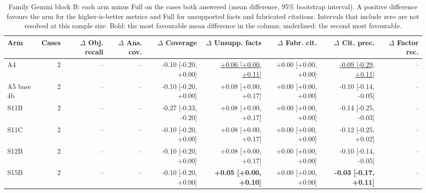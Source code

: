 \begin{table}[t]
\centering\footnotesize
\begin{adjustbox}{max width=\textwidth}
\begin{tabular}{@{}lrrrrrrrr@{}}
\toprule
Arm & Cases & $\Delta$ Obj. recall & $\Delta$ Ans. cov. & $\Delta$ Coverage & $\Delta$ Unsupp. facts & $\Delta$ Fabr. cit. & $\Delta$ Cit. prec. & $\Delta$ Factor rec. \\
\midrule
A4 & 2 & -- & -- & -0.10 [-0.20, +0.00] & \underline{+0.06 [+0.00, +0.11]} & +0.00 [+0.00, +0.00] & \underline{-0.09 [-0.29, +0.11]} & -- \\
A5 base 4b & 2 & -- & -- & -0.10 [-0.20, +0.00] & +0.08 [+0.00, +0.17] & +0.00 [+0.00, +0.00] & -0.10 [-0.14, -0.05] & -- \\
S11B & 2 & -- & -- & -0.27 [-0.33, -0.20] & +0.08 [+0.00, +0.17] & +0.00 [+0.00, +0.00] & -0.14 [-0.25, -0.03] & -- \\
S11C & 2 & -- & -- & -0.10 [-0.20, +0.00] & +0.08 [+0.00, +0.17] & +0.00 [+0.00, +0.00] & -0.12 [-0.25, +0.02] & -- \\
S12B & 2 & -- & -- & -0.10 [-0.20, +0.00] & +0.08 [+0.00, +0.17] & +0.00 [+0.00, +0.00] & -0.10 [-0.14, -0.05] & -- \\
S15B & 2 & -- & -- & -0.10 [-0.20, +0.00] & \textbf{+0.05 [+0.00, +0.10]} & +0.00 [+0.00, +0.00] & \textbf{-0.03 [-0.17, +0.11]} & -- \\
\bottomrule
\end{tabular}
\end{adjustbox}
\caption{Family Gemini block B: each arm minus Full on the cases both answered (mean difference, 95\% bootstrap interval). A positive difference favours the arm for the higher-is-better metrics and Full for unsupported facts and fabricated citations. Intervals that include zero are not resolved at this sample size. Bold: the most favourable mean difference in the column; underlined: the second most favourable.}
\label{tab:ablate_shravani_gem}
\end{table}
